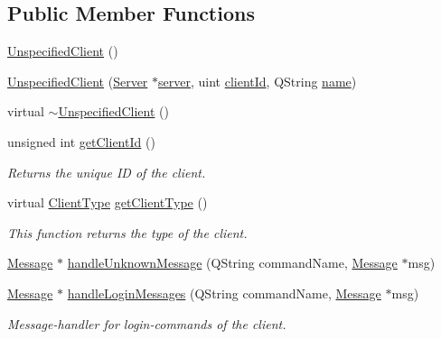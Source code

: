 \subsection*{Public Member Functions}
\begin{DoxyCompactItemize}
\item 
\hyperlink{class_server_appl_1_1_unspecified_client_adefdd2e73ed80da4934a206f00355d15}{Unspecified\+Client} ()
\item 
\hyperlink{class_server_appl_1_1_unspecified_client_a53f7a9a8ee49f3ab69a7aceb5fde3358}{Unspecified\+Client} (\hyperlink{class_server_appl_1_1_server}{Server} $\ast$\hyperlink{class_server_appl_1_1_unspecified_client_aed25c6192d4e27602c2bf4f0721360b5}{server}, uint \hyperlink{class_server_appl_1_1_unspecified_client_a9a3cf2d070f19fb2bfd7d544053955b0}{client\+Id}, Q\+String \hyperlink{class_server_appl_1_1_unspecified_client_a66f3dc8bd71e34f52ad02f692808593c}{name})
\item 
virtual \hyperlink{class_server_appl_1_1_unspecified_client_a2bd494a24d1b0f625efc77898c5da6b2}{$\sim$\+Unspecified\+Client} ()
\item 
unsigned int \hyperlink{class_server_appl_1_1_unspecified_client_a90eb13ada4cb106816c025095d69c124}{get\+Client\+Id} ()
\begin{DoxyCompactList}\small\item\em Returns the unique I\+D of the client. \end{DoxyCompactList}\item 
virtual \hyperlink{_unspecified_client_8h_af7f22c7d662171af2c3a5b74f621dc98}{Client\+Type} \hyperlink{class_server_appl_1_1_unspecified_client_a239fa0949cf9b054593d7b1570e55624}{get\+Client\+Type} ()
\begin{DoxyCompactList}\small\item\em This function returns the type of the client. \end{DoxyCompactList}\item 
\hyperlink{class_message}{Message} $\ast$ \hyperlink{class_server_appl_1_1_unspecified_client_abb48827aa6564e1550a8b068076d37f2}{handle\+Unknown\+Message} (Q\+String command\+Name, \hyperlink{class_message}{Message} $\ast$msg)
\item 
\hyperlink{class_message}{Message} $\ast$ \hyperlink{class_server_appl_1_1_unspecified_client_a2b57cebb68616c0973ff48274de30253}{handle\+Login\+Messages} (Q\+String command\+Name, \hyperlink{class_message}{Message} $\ast$msg)
\begin{DoxyCompactList}\small\item\em Message-\/handler for login-\/commands of the client. \end{DoxyCompactList}\item 

\end{DoxyCompactItemize}
